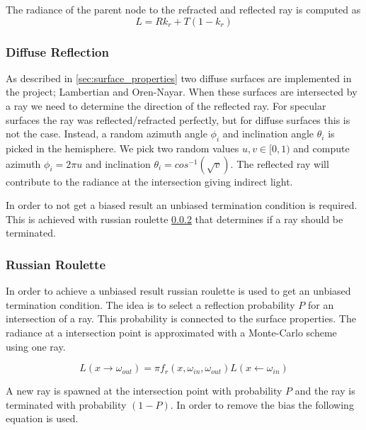 \documentclass[a4paper, twocolumn]{article}
\begin{document}
          The radiance of the parent node to the refracted and reflected ray is computed as
          \begin{equation*}
            L = R k_r + T (1-k_r)
          \end{equation*}

          \subsubsection{Diffuse Reflection} \label{sec:diffuse_refraction}
          As described in \ref{sec:surface_properties} two diffuse surfaces are implemented in the project; Lambertian and Oren-Nayar. When these surfaces are intersected by a ray we need to determine the direction of the reflected ray. For specular surfaces the ray was reflected/refracted perfectly, but for diffuse surfaces this is not the case. Instead, a random azimuth angle $\phi_i$ and inclination angle $\theta_i$ is picked in the hemisphere. We pick two random values $u, v \in [0,1)$ and compute azimuth $\phi_i = 2\pi u$ and inclination $\theta_i = cos^{-1}(\sqrt{v})$. The reflected ray will contribute to the radiance at the intersection giving indirect light.

          In order to not get a biased result an unbiased termination condition is required. This is achieved with russian roulette \ref{sec:russian_roulette} that determines if a ray should be terminated.

          \subsubsection{Russian Roulette} \label{sec:russian_roulette}
          In order to achieve a unbiased result russian roulette is used to get an unbiased termination condition. The idea is to select a reflection probability $P$ for an intersection of a ray. This probability is connected to the surface properties. The radiance at a intersection point is approximated with a Monte-Carlo scheme using one ray.

          \begin{equation*}
            L(x \rightarrow \omega_{out}) = \pi f_r(x, \omega_{in}, \omega_{out}) L(x \leftarrow \omega_{in})
          \end{equation*}

          A new ray is spawned at the intersection point with probability $P$ and the ray is terminated with probability $(1-P)$. In order to remove the bias the following equation is used.
\end{document}
